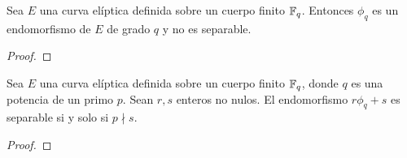 \begin{lema}
	Sea $E$ una curva elíptica definida sobre un cuerpo finito $\mathbb{F}_q$. Entonces $\phi_q$ es un endomorfismo de $E$ de grado $q$ y no es separable.
\end{lema}
\begin{proof}
\end{proof}

\begin{proposicion}
	Sea $E$ una curva elíptica definida sobre un cuerpo finito $\mathbb{F}_q$, donde $q$ es una potencia de un primo $p$. Sean $r, s$ enteros no nulos. El endomorfismo $r \phi_q + s$ es separable si y solo si $p \nmid s$.
\end{proposicion}
\begin{proof}
\end{proof}


